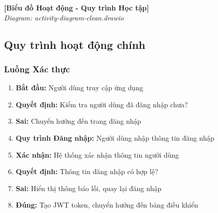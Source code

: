 \begin{center}
\textbf{[Biểu đồ Hoạt động - Quy trình Học tập]}\\
\textit{Diagram: activity-diagram-clean.drawio}
\end{center}

\subsection{Quy trình hoạt động chính}

\subsubsection{Luồng Xác thực}
\begin{enumerate}
    \item \textbf{Bắt đầu:} Người dùng truy cập ứng dụng
    \item \textbf{Quyết định:} Kiểm tra người dùng đã đăng nhập chưa?
    \item \textbf{Sai:} Chuyển hướng đến trang đăng nhập
    \item \textbf{Quy trình Đăng nhập:} Người dùng nhập thông tin đăng nhập
    \item \textbf{Xác nhận:} Hệ thống xác nhận thông tin người dùng
    \item \textbf{Quyết định:} Thông tin đăng nhập có hợp lệ?
    \item \textbf{Sai:} Hiển thị thông báo lỗi, quay lại đăng nhập
    \item \textbf{Đúng:} Tạo JWT token, chuyển hướng đến bảng điều khiển
\end{enumerate}

